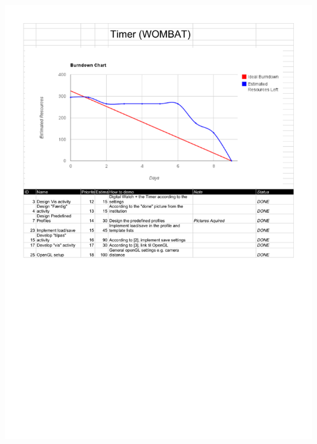 \begin{center}
		\includegraphics[scale=0.5]{Development/burndown_charts/Sprint_2.pdf}

\end{center}
